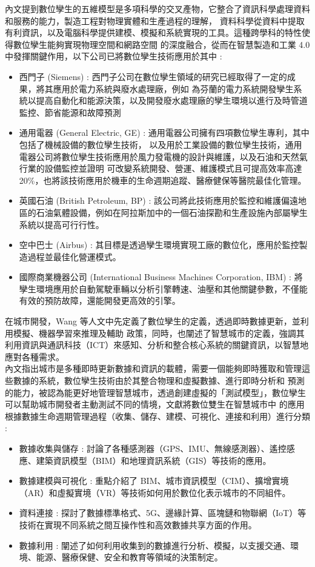 內文提到數位孿生的五維模型是多項科學的交叉產物，它整合了資訊科學處理資料和服務的能力，製造工程對物理實體和生產過程的理解，
資料科學從資料中提取有利資訊，以及電腦科學提供建模、模擬和系統實現的工具。這種跨學科的特性使得數位孿生能夠實現物理空間和網路空間
的深度融合，從而在智慧製造和工業 4.0 中發揮關鍵作用，以下公司已將數位孿生技術應用於其中 : \\
\begin{itemize}
    \item 西門子 (Siemens) :
          西門子公司在數位孿生領域的研究已經取得了一定的成果，將其應用於電力系統與廢水處理廠，例如
          為芬蘭的電力系統開發孿生系統以提高自動化和能源決策，以及開發廢水處理廠的孿生環境以進行及時管道監控、節省能源和故障預測
    \item 通用電器 (General Electric, GE) :
          通用電器公司擁有四項數位孿生專利，其中包括了機械設備的數位孿生技術，
          以及用於工業設備的數位孿生技術，通用電器公司將數位孿生技術應用於風力發電機的設計與維護，以及石油和天然氣行業的設備監控並證明
          可改變系統開發、營運、維護模式且可提高效率高達 20\%，也將該技術應用於機車的生命週期追蹤、醫療健保等醫院最佳化管理。
    \item 英國石油 (British Petroleum, BP) :
          該公司將此技術應用於監控和維護偏遠地區的石油氣體設備，例如在阿拉斯加中的一個石油探勘和生產設施內部屬孿生系統以提高可行行性。
    \item 空中巴士 (Airbus) :
          其目標是透過孿生環境實現工廠的數位化，應用於監控製造過程並最佳化營運模式。
    \item 國際商業機器公司 (International Business Machines Corporation, IBM) :
          將孿生環境應用於自動駕駛車輛以分析引擎轉速、油壓和其他關鍵參數，不僅能有效的預防故障，還能開發更高效的引擎。
\end{itemize}
在城市開發，Wang 等人\cite{Glaessgen2012DigitalTwin}文中先定義了數位孿生的定義，透過即時數據更新，並利用模擬、機器學習來推理及輔助
政策，同時，也闡述了智慧城市的定義，強調其利用資訊與通訊科技（ICT）來感知、分析和整合核心系統的關鍵資訊，以智慧地應對各種需求。\\
內文指出城市是多種即時更新數據和資訊的載體，需要一個能夠即時獲取和管理這些數據的系統，數位孿生技術由於其整合物理和虛擬數據、進行即時分析和
預測的能力，被認為能更好地管理智慧城市，透過創建虛擬的「測試模型」，數位孿生可以幫助城市開發者主動測試不同的情境，文獻將數位雙生在智慧城市中
的應用根據數據生命週期管理過程（收集、儲存、建模、可視化、連接和利用）進行分類 :
\begin{itemize}
    \item 數據收集與儲存 :
          討論了各種感測器（GPS、IMU、無線感測器）、遙控感應、建築資訊模型（BIM）和地理資訊系統（GIS）等技術的應用。
    \item 數據建模與可視化 :
          重點介紹了 BIM、城市資訊模型（CIM）、擴增實境（AR）和虛擬實境（VR）等技術如何用於數位化表示城市的不同組件。
    \item 資料連接 :
          探討了數據標準格式、5G、邊緣計算、區塊鏈和物聯網（IoT）等技術在實現不同系統之間互操作性和高效數據共享方面的作用。
    \item 數據利用 :
          闡述了如何利用收集到的數據進行分析、模擬，以支援交通、環境、能源、醫療保健、安全和教育等領域的決策制定。
\end{itemize}
